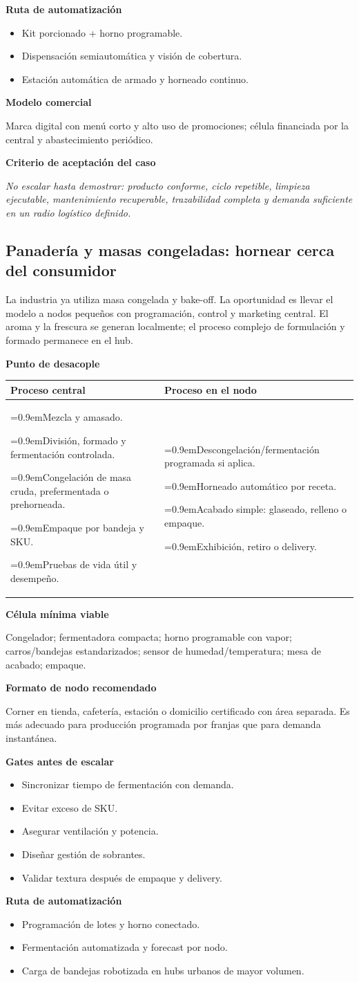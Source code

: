 \documentclass[11pt,a4paper]{article}
\makeatletter
\newcommand{\etiqueta}[1]{\par\medskip\noindent\textbf{#1}\par\nopagebreak\smallskip}
\newcommand{\ti}{\par\hangindent=0.9em\hangafter=1\noindent\makebox[0.9em][l]{\textbullet}}
\newcommand{\desacople}[2]{\etiqueta{Punto de desacople}
  {\small\noindent\begin{tabularx}{\textwidth}{@{}>{\raggedright\arraybackslash}X>{\raggedright\arraybackslash}X@{}}
  \toprule \textbf{Proceso central} & \textbf{Proceso en el nodo}\\ \midrule
  #1 & #2\\ \bottomrule\end{tabularx}}\par}
\newcommand{\rutas}[3]{\etiqueta{Ruta de automatización}
  \begin{itemize}[leftmargin=2.6em,labelwidth=2em]
  \item[\textbf{1.0}] #1
  \item[\textbf{2.0}] #2
  \item[\textbf{3.0}] #3
  \end{itemize}}
\newcommand{\criterio}{\etiqueta{Criterio de aceptación del caso}
  \noindent\textit{No escalar hasta demostrar: producto conforme, ciclo repetible, limpieza ejecutable,
  mantenimiento recuperable, trazabilidad completa y demanda suficiente en un radio logístico definido.}\par}
\makeatother
\begin{document}
\rutas{Kit porcionado + horno programable.}
{Dispensación semiautomática y visión de cobertura.}
{Estación automática de armado y horneado continuo.}

\etiqueta{Modelo comercial}
Marca digital con menú corto y alto uso de promociones; célula financiada por la central y
abastecimiento periódico.

\criterio

\subsection{Panadería y masas congeladas: hornear cerca del consumidor}
La industria ya utiliza masa congelada y bake-off. La oportunidad es llevar el modelo a nodos pequeños con
programación, control y marketing central. El aroma y la frescura se generan localmente; el proceso
complejo de formulación y formado permanece en el hub.

\desacople{%
\ti Mezcla y amasado.
\ti División, formado y fermentación controlada.
\ti Congelación de masa cruda, prefermentada o prehorneada.
\ti Empaque por bandeja y SKU.
\ti Pruebas de vida útil y desempeño.}{%
\ti Descongelación/fermentación programada si aplica.
\ti Horneado automático por receta.
\ti Acabado simple: glaseado, relleno o empaque.
\ti Exhibición, retiro o delivery.}

\etiqueta{Célula mínima viable}
Congelador; fermentadora compacta; horno programable con vapor; carros/bandejas estandarizados; sensor de
humedad/temperatura; mesa de acabado; empaque.

\etiqueta{Formato de nodo recomendado}
Corner en tienda, cafetería, estación o domicilio certificado con área separada. Es más adecuado para
producción programada por franjas que para demanda instantánea.

\etiqueta{Gates antes de escalar}
\begin{itemize}
\item Sincronizar tiempo de fermentación con demanda.
\item Evitar exceso de SKU.
\item Asegurar ventilación y potencia.
\item Diseñar gestión de sobrantes.
\item Validar textura después de empaque y delivery.
\end{itemize}

\rutas{Programación de lotes y horno conectado.}
{Fermentación automatizada y forecast por nodo.}
{Carga de bandejas robotizada en hubs urbanos de mayor volumen.}
\end{document}
